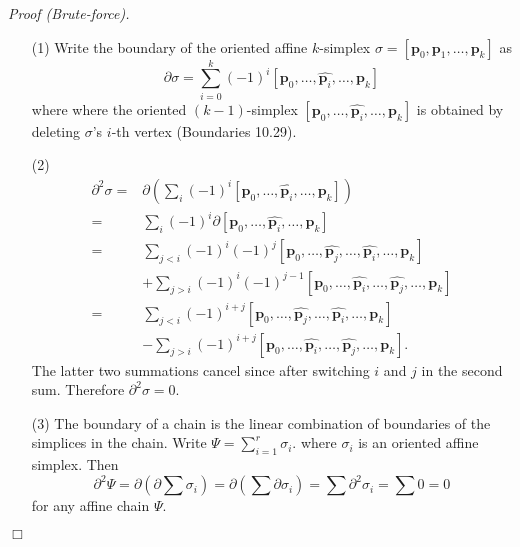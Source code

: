 \documentclass{article}
\begin{document}
\emph{Proof (Brute-force).}
\begin{enumerate}
\item[(1)]
  Write the boundary of the oriented affine $k$-simplex
  $\sigma = [\mathbf{p}_0,\mathbf{p}_1,\ldots,\mathbf{p}_k]$ as
  \[
    \partial \sigma
    = \sum_{i=0}^{k}(-1)^i
    [\mathbf{p}_0,\ldots,\widehat{\mathbf{p}_i},\ldots,\mathbf{p}_k]
  \]
  where where the oriented $(k-1)$-simplex
  $[\mathbf{p}_0,\ldots,\widehat{\mathbf{p}_i},\ldots,\mathbf{p}_k]$
  is obtained by deleting $\sigma$'s $i$-th vertex (Boundaries 10.29).

\item[(2)]
  \begin{align*}
    \partial^2 \sigma
    =& \partial \left( \sum_{i}(-1)^{i}
      [\mathbf{p}_0,\ldots,\widehat{\mathbf{p}_i},\ldots,\mathbf{p}_k] \right) \\
    =& \sum_{i}(-1)^{i}
      \partial [\mathbf{p}_0,\ldots,\widehat{\mathbf{p}_i},\ldots,\mathbf{p}_k] \\
    =& \sum_{j<i} (-1)^{i}(-1)^{j}
      [\mathbf{p}_0,\ldots,\widehat{\mathbf{p}_j},\ldots,\widehat{\mathbf{p}_i},\ldots,\mathbf{p}_k] \\
      &+ \sum_{j>i} (-1)^{i}(-1)^{j-1}
      [\mathbf{p}_0,\ldots,\widehat{\mathbf{p}_i},\ldots,\widehat{\mathbf{p}_j},\ldots,\mathbf{p}_k] \\
    =& \sum_{j<i} (-1)^{i+j}
      [\mathbf{p}_0,\ldots,\widehat{\mathbf{p}_j},\ldots,\widehat{\mathbf{p}_i},\ldots,\mathbf{p}_k] \\
      &- \sum_{j>i} (-1)^{i+j}
      [\mathbf{p}_0,\ldots,\widehat{\mathbf{p}_i},\ldots,\widehat{\mathbf{p}_j},\ldots,\mathbf{p}_k].
  \end{align*}
  The latter two summations cancel since after switching $i$ and $j$ in the second sum.
  Therefore $\partial^2 \sigma = 0$.

\item[(3)]
  The boundary of a chain is the linear combination of boundaries of the simplices in the chain.
  Write $\Psi = \sum_{i=1}^{r} \sigma_i$. where $\sigma_i$ is an oriented affine simplex.
  Then
  \[
    \partial^2 \Psi
    = \partial \left(\partial \sum \sigma_i \right)
    = \partial \left( \sum \partial\sigma_i \right)
    = \sum \partial^2 \sigma_i
    = \sum 0
    = 0
  \]
  for any affine chain $\Psi$.
\end{enumerate}
$\Box$ \\\\
\end{document}
